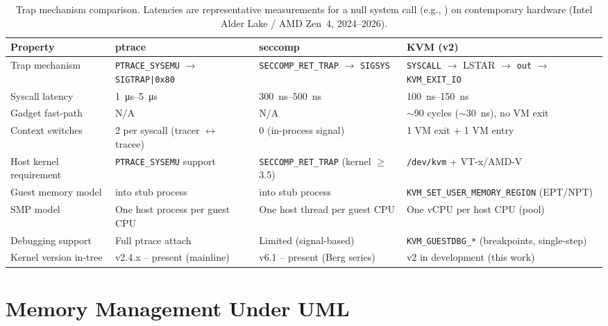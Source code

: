 \begin{table}[ht]
\centering
\caption{Trap mechanism comparison.  Latencies are representative
measurements for a null system call (e.g., ) on
contemporary hardware (Intel Alder Lake / AMD Zen~4, 2024--2026).}
\label{tab:trap-comparison}
\small
\begin{tabularx}{\textwidth}{@{} l Y Y Y @{}}
\toprule
\textbf{Property} &
  \textbf{ptrace} &
  \textbf{seccomp} &
  \textbf{KVM (v2)} \\
\midrule
Trap mechanism &
  \texttt{PTRACE\_SYSEMU} $\rightarrow$ \texttt{SIGTRAP|0x80} &
  \texttt{SECCOMP\_RET\_TRAP} $\rightarrow$ \texttt{SIGSYS} &
  \texttt{SYSCALL} $\rightarrow$ LSTAR $\rightarrow$ \texttt{out} $\rightarrow$ \texttt{KVM\_EXIT\_IO} \\
\midrule
Syscall latency &
  \SIrange{1}{5}{\micro\second} &
  \SIrange{300}{500}{\nano\second} &
  \SIrange{100}{150}{\nano\second} \\
\midrule
Gadget fast-path &
  N/A &
  N/A &
  $\sim$90 cycles ($\sim$\SI{30}{\nano\second}), no VM exit \\
\midrule
Context switches &
  2 per syscall (tracer $\leftrightarrow$ tracee) &
  0 (in-process signal) &
  1 VM exit + 1 VM entry \\
\midrule
Host kernel requirement &
  \texttt{PTRACE\_SYSEMU} support &
  \texttt{SECCOMP\_RET\_TRAP} (kernel $\geq$ 3.5) &
  \texttt{/dev/kvm} + VT-x/AMD-V \\
\midrule
Guest memory model &
   into stub process &
   into stub process &
  \texttt{KVM\_SET\_USER\_MEMORY\_REGION} (EPT/NPT) \\
\midrule
SMP model &
  One host process per guest CPU &
  One host thread per guest CPU &
  One vCPU per host CPU (pool) \\
\midrule
Debugging support &
  Full ptrace attach &
  Limited (signal-based) &
  \texttt{KVM\_GUESTDBG\_*} (breakpoints, single-step) \\
\midrule
Kernel version in-tree &
  v2.4.x -- present (mainline) &
  v6.1 -- present (Berg series) &
  v2 in development (this work) \\
\bottomrule
\end{tabularx}
\end{table}


\section{Memory Management Under UML}
\label{sec:foundations:memory}

